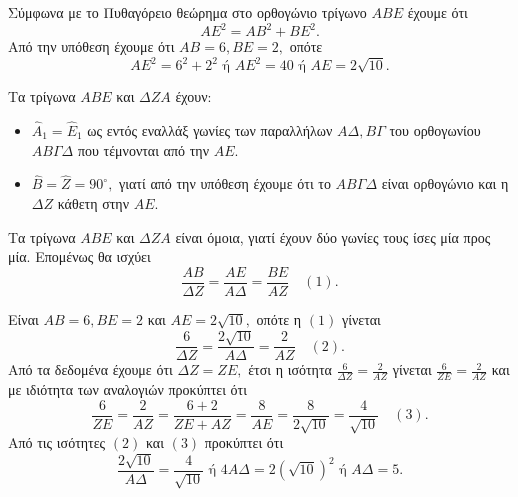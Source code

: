\begin{alist}
    \item[α)] Σύμφωνα με το Πυθαγόρειο θεώρημα στο ορθογώνιο τρίγωνο $ABE$ έχουμε ότι
    \[ AE^2 = AB^2 + BE^2. \]
    Από την υπόθεση έχουμε ότι $AB = 6, BE = 2,$ οπότε
    \[ AE^2 = 6^2 + 2^2 \text{ ή } AE^2 = 40 \text{ ή } AE = 2\sqrt{10}. \]

    \item[β)] Τα τρίγωνα $ABE$ και $\Delta ZA$ έχουν:
    \begin{itemize}
        \item $\hat{A}_1 = \hat{E}_1$ ως εντός εναλλάξ γωνίες των παραλλήλων $A\Delta, B\Gamma$ του ορθογωνίου $AB\Gamma\Delta$ που τέμνονται από την $AE.$
        \item $\hat{B} = \hat{Z} = 90^\circ,$ γιατί από την υπόθεση έχουμε ότι το $AB\Gamma\Delta$ είναι ορθογώνιο και η $\Delta Z$ κάθετη στην $AE.$
    \end{itemize}
    Τα τρίγωνα $ABE$ και $\Delta ZA$ είναι όμοια, γιατί έχουν δύο γωνίες τους ίσες μία προς μία.
    Επομένως θα ισχύει
    \[ \frac{AB}{\Delta Z} = \frac{AE}{A\Delta} = \frac{BE}{AZ} \quad (1). \]

    \item[γ)] Είναι $AB = 6, BE = 2$ και $AE = 2\sqrt{10},$ οπότε η $(1)$ γίνεται
    \[ \frac{6}{\Delta Z} = \frac{2\sqrt{10}}{A\Delta} = \frac{2}{AZ} \quad (2). \]
    Από τα δεδομένα έχουμε ότι $\Delta Z = ZE,$ έτσι η ισότητα $\frac{6}{\Delta Z} = \frac{2}{AZ}$ γίνεται $\frac{6}{ZE} = \frac{2}{AZ}$ και με ιδιότητα των αναλογιών προκύπτει ότι
    \[ \frac{6}{ZE} = \frac{2}{AZ} = \frac{6+2}{ZE+AZ} = \frac{8}{AE} = \frac{8}{2\sqrt{10}} = \frac{4}{\sqrt{10}} \quad (3). \]
    Από τις ισότητες $(2)$ και $(3)$ προκύπτει ότι
    \[ \frac{2\sqrt{10}}{A\Delta} = \frac{4}{\sqrt{10}} \text{ ή } 4A\Delta = 2(\sqrt{10})^2 \text{ ή } A\Delta = 5. \]
\end{alist}